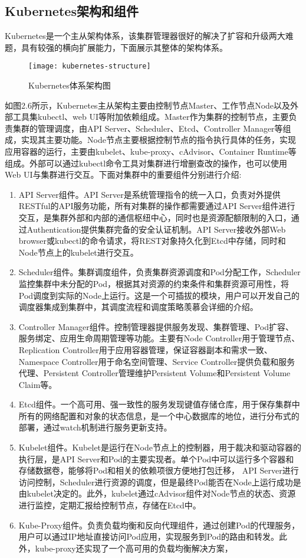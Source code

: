 \subsection{Kubernetes架构和组件}
Kubernetes是一个主从架构体系，该集群管理器很好的解决了扩容和升级两大难题，具有较强的横向扩展能力，下面展示其整体的架构体系。
\begin{figure}[H] %
	\centering
	\texttt{[image: kubernetes-structure]}
	\caption{Kubernetes体系架构图}
\end{figure}
如图2.6所示，Kubernetes主从架构主要由控制节点Master、工作节点Node以及外部工具集kubectl、web UI等附加依赖组成。Master作为集群的控制节点，主要负责集群的管理调度，由API Server、Scheduler、Etcd、Controller Manager等组成，实现其主要功能。Node节点主要根据控制节点的指令执行具体的任务，实现应用容器的运行，主要由kubelet、kube-proxy、cAdvisor、Container Runtime等组成。外部可以通过kubectl命令工具对集群进行增删查改的操作，也可以使用Web UI与集群进行交互。下面对集群中的重要组件分别进行介绍:
\begin{enumerate}[1.]
	\item  API Server组件。API Server是系统管理指令的统一入口，负责对外提供RESTful的API服务功能，所有对集群的操作都需要通过API Server组件进行交互，是集群外部和内部的通信枢纽中心，同时也是资源配额限制的入口，通过Authentication提供集群完备的安全认证机制。API Server接收外部Web browser或kubectl的命令请求，将REST对象持久化到Etcd中存储，同时和Node节点上的kubelet进行交互。
	\item Scheduler组件。集群调度组件，负责集群资源调度和Pod分配工作，Scheduler监控集群中未分配的Pod，根据其对资源的约束条件和集群资源可用性，将Pod调度到实际的Node上运行。这是一个可插拔的模块，用户可以开发自己的调度器集成到集群中，其调度流程和调度策略羡慕会详细的介绍。
	\item Controller Manager组件。控制管理器提供服务发现、集群管理、Pod扩容、服务绑定、应用生命周期管理等功能。主要有Node Controller用于管理节点、Replication Controller用于应用容器管理，保证容器副本和需求一致、Namespace Controller用于命名空间管理、Service Controller提供负载和服务代理、Persistent Controller管理维护Persistent Volume和Persistent Volume Claim等。
	\item Etcd组件。一个高可用、强一致性的服务发现键值存储仓库，用于保存集群中所有的网络配置和对象的状态信息，是一个中心数据库的地位，进行分布式的部署，通过watch机制进行服务更新支持。
	\item Kubelet组件。Kubelet是运行在Node节点上的控制器，用于裁决和驱动容器的执行层，是API Server和Pod的主要实现者。单个Pod中可以运行多个容器和存储数据卷，能够将Pod和相关的依赖项很方便地打包迁移，	API Server进行访问控制，Scheduler进行资源的调度，但是最终Pod能否在Node上运行成功是由kubelet决定的。此外，kubelet通过cAdvisor组件对Node节点的状态、资源进行监控，定期汇报给控制节点，存储在Etcd中。
	\item Kube-Proxy组件。负责负载均衡和反向代理组件，通过创建Pod的代理服务，用户可以通过IP地址直接访问Pod应用，实现服务到Pod的路由和转发。此外，kube-proxy还实现了一个高可用的负载均衡解决方案，
\end{enumerate}

